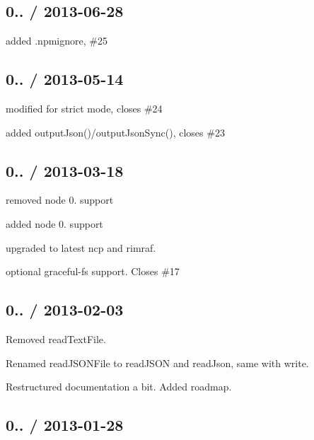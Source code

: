 \subsection*{0.. / 2013-\/06-\/28 }


\begin{DoxyItemize}
\item added .npmignore, \#25
\end{DoxyItemize}

\subsection*{0.. / 2013-\/05-\/14 }


\begin{DoxyItemize}
\item modified for {\ttfamily strict} mode, closes \#24
\item added {\ttfamily output\+Json()/output\+Json\+Sync()}, closes \#23
\end{DoxyItemize}

\subsection*{0.. / 2013-\/03-\/18 }


\begin{DoxyItemize}
\item removed node 0. support
\item added node 0. support
\item upgraded to latest {\ttfamily ncp} and {\ttfamily rimraf}.
\item optional {\ttfamily graceful-\/fs} support. Closes \#17
\end{DoxyItemize}

\subsection*{0.. / 2013-\/02-\/03 }


\begin{DoxyItemize}
\item Removed {\ttfamily read\+Text\+File}.
\item Renamed {\ttfamily read\+J\+S\+O\+N\+File} to {\ttfamily read\+J\+S\+ON} and {\ttfamily read\+Json}, same with write.
\item Restructured documentation a bit. Added roadmap.
\end{DoxyItemize}

\subsection*{0.. / 2013-\/01-\/28 }


